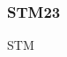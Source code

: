\begin{table}[]
\begin{tabular}{|l|l|l|}
\end{tabular}
\end{table}




%
%
%
%
%



\subsubsection{STM23}
STM